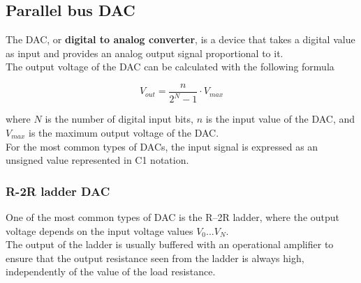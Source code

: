 \begin{center}
{
    }
    \vspace*{1cm}
    
\end{center}


\newpage

\subsection{Parallel bus DAC}

The DAC, or \textbf{digital to analog converter}, is a device that takes a digital value as input and provides an analog output signal proportional to it. \\
The output voltage of the DAC can be calculated with the following formula


\vspace*{0.25cm} 
\[
    V_{out} = \frac{n}{2^N-1} \cdot V_{max}
\]
\vspace*{0.25cm} 

\noindent
where \(N\) is the number of digital input bits, \(n\) is the input value of the DAC, and \(V_{max}\) is the maximum output voltage of the DAC. \\
For the most common types of DACs, the input signal is expressed as an unsigned value represented in C1 notation.

\subsubsection{R-2R ladder DAC}
One of the most common types of DAC is the R–2R ladder, where the output voltage depends on the input voltage values \(V_0 \ldots V_N\). \\
The output of the ladder is usually buffered with an operational amplifier to ensure that the output resistance seen from the ladder is always high, independently of the value of the load resistance.

